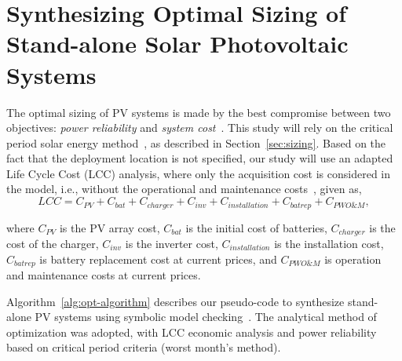 \documentclass[runningheads]{llncs}
\begin{document}
\section{Synthesizing Optimal Sizing of Stand-alone Solar Photovoltaic Systems}

The optimal sizing of PV systems is made by the best compromise between two objectives: \textit{power reliability} and \textit{system cost}~\cite{Alsadi2018}. This study will rely on the critical period solar energy method~\cite{Pinho}, as described in Section~\ref{sec:sizing}. Based on the fact that the deployment location is not specified, our study will use an adapted Life Cycle Cost (LCC) analysis, where only the acquisition cost is considered in the model, i.e., without the operational and maintenance costs~\cite{Alsadi2018}, given as,
%
\begin{equation}
\label{eq:LCC}
LCC = C_{PV} + C_{bat} + C_{charger} + C_{inv} + C_{installation} + C_{batrep} + C_{PWO\&M},
\end{equation}

\noindent where $C_{PV}$ is the PV array cost, $C_{bat}$ is the initial cost of batteries, $C_{charger}$ is the cost of the charger, $C_{inv}$ is the inverter cost, $C_{installation}$ is the installation cost, $C_{batrep}$ is battery replacement cost at current prices, and $C_{PWO\&M}$ is operation and maintenance costs at current prices.

Algorithm~\ref{alg:opt-algorithm} describes our pseudo-code to synthesize stand-alone PV systems using symbolic model checking~\cite{DBLP:journals/corr/abs-1909-13139}. The analytical method of optimization was adopted, with LCC economic analysis and power reliability based on critical period criteria (worst month's method).
\end{document}
